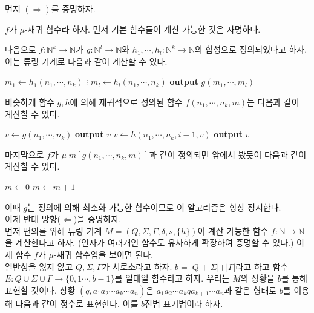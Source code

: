 \documentclass[b5paper]{book}
\theoremstyle{definition}
\newenvironment{pf*}{\pushQED{\qed}\pf}{\popQED\endpf}
\begin{document}
\begin{pf*}
    먼저 $(\Rightarrow)$를 증명하자. 

    $f$가 $\mu$-재귀 함수라 하자. 먼저 기본 함수들이 계산 가능한 것은 자명하다. 

    다음으로 $f:\mathbb{N}^k \rightarrow \mathbb{N}$가 
    $g: \mathbb{N}^l \rightarrow \mathbb{N}$와 $h_1, \cdots, h_l:\mathbb{N}^k \rightarrow 
    \mathbb{N}$의 합성으로 정의되었다고 하자. 이는 튜링 기계로 다음과 같이 계산할 수 있다.
    \begin{algorithmic}
        \State $m_1 \gets h_1(n_1, \cdots, n_k)$
        \State $\vdots$
        \State $m_l \gets h_l(n_1, \cdots, n_k)$
        \State \textbf{output} $g(m_1, \cdots, m_l)$
    \end{algorithmic}
    비슷하게 함수 $g, h$에 의해 재귀적으로 정의된 함수 $f(n_1, \cdots, n_k, m)$는 다음과 같이 계산할 수 있다.
    \begin{algorithmic}
        \State $v \gets g(n_1, \cdots, n_k)$
        \State \textbf{output} $v$
        \Else
        \State $v \gets h(n_1, \cdots, n_k, i-1, v)$
        \EndFor
        \State \textbf{output} $v$
        \EndIf
    \end{algorithmic}
    마지막으로 $f$가 $\mu \; m[g(n_1, \cdots, n_k, m)]$과 같이 정의되면 앞에서 봤듯이 
    다음과 같이 계산할 수 있다.
    \begin{algorithmic}
        \State $m \gets 0$
            \State $m \gets m+1$
        \EndWhile
    \end{algorithmic}
    이때 $g$는 정의에 의해 최소화 가능한 함수이므로 이 알고리즘은 항상 정지한다.\\
    이제 반대 방향($\Leftarrow$)을 증명하자.\\
    먼저 편의를 위해 튜링 기계 $M = (Q, \Sigma, \Gamma, \delta,
    s, \{h\})$이 계산 가능한 함수 $f: \mathbb{N} \rightarrow \mathbb{N}$을 
    계산한다고 하자. (인자가 여러개인 함수도 
    유사하게 확장하여 증명할 수 있다.) 이제 함수 $f$가 $\mu$-재귀 함수임을 보이면 된다. \\
    일반성을 잃지 않고 $Q, \Sigma, \Gamma$가 서로소라고 하자. $b = \vert Q \vert + \vert \Sigma \vert 
    + \vert \Gamma \vert$라고 하고 함수 $E:Q \cup \Sigma \cup \Gamma \rightarrow \{0, 1 
    \cdots, b-1\}$를 일대일 함수라고 하자. 우리는 $M$의 상황을 $b$를 통해 표현할 것이다. 상황 $(q,
    a_1a_2 \cdots \underline{a_k} \cdots a_n)$은 $a_1a_2\cdots a_k q a_{k+1} \cdots a_n$과 같은 형태로 
    $b$를 이용해 다음과 같이 정수로 표현한다. 이를 $b$진법 표기법이라 하자. 

\end{pf*}
\end{document}
